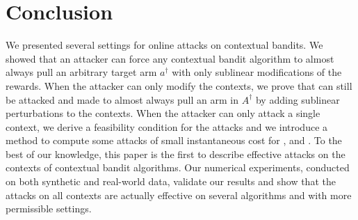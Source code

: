 \section{Conclusion}
We presented several settings for online attacks on contextual bandits.
We showed that an attacker can force any contextual bandit algorithm to almost always pull an arbitrary target arm $a^{\dagger}$ with only sublinear modifications of the rewards. When the attacker can only modify the contexts, we prove that \linucb can still be attacked and made to almost always pull an arm in $A^{\dagger}$ by adding sublinear perturbations to the contexts. 
When the attacker can only attack a single context, we derive a feasibility condition for the attacks and we introduce a method to compute some attacks of small instantaneous cost for \linucb, \epsgreedy and \lints.
To the best of our knowledge, this paper is the first to describe effective attacks on the contexts of contextual bandit algorithms. Our numerical experiments, conducted on both synthetic and real-world data, validate our results and show that the attacks on all contexts are actually effective on several algorithms and with more permissible settings. 



